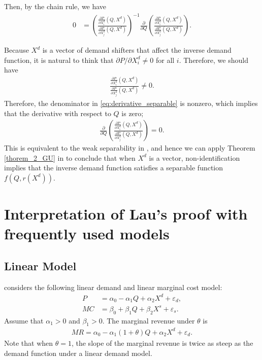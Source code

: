 \documentclass[11pt, a4paper]{article}
\theoremstyle{remark}
\begin{document}
Then, by the chain rule, we have
\begin{align}
    0 & = \left(\frac{\frac{\partial P}{\partial X^{d}_{i}}(Q, X^{d})}{\frac{\partial P}{\partial X^{d}_{j}}(Q, X^{d})}\right)^{-1} \frac{\partial}{\partial Q} \left(\frac{\frac{\partial P}{\partial X^{d}_{i}}(Q, X^{d})}{\frac{\partial P}{\partial X^{d}_{j}}(Q, X^{d})}\right).
    \label{eq:derivative_separable}
\end{align}

Because $X^{d}$ is a vector of demand shifters that affect the inverse demand function, it is natural to think that $\partial P/\partial X^{d}_{i} \ne 0$ for all $i$.
Therefore, we should have
\begin{align}
    \frac{\frac{\partial P}{\partial X^{d}_{i}}(Q, X^{d})}{\frac{\partial P}{\partial X^{d}_{j}}(Q, X^{d})} \ne 0.
\end{align}
Therefore, the denominator in \eqref{eq:derivative_separable} is nonzero, which implies that the derivative with respect to $Q$ is zero;
\begin{align}
    \frac{\partial}{\partial Q} \left(\frac{\frac{\partial P}{\partial X^{d}_{i}}(Q, X^{d})}{\frac{\partial P}{\partial X^{d}_{j}}(Q, X^{d})}\right) = 0.
\end{align}
This is equivalent to the weak separability in \citet{goldmanNote1964}, and hence we can apply Theorem \ref{thorem_2_GU} in \citet{goldmanNote1964} to conclude that when $X^{d}$ is a vector, non-identification implies that the inverse demand function satisfies a separable function $f(Q, r(X^{d}))$.



\section{Interpretation of Lau's proof with frequently used models}
\subsection{Linear Model}

\citet{bresnahan1982oligopoly} considers the following linear demand and linear marginal cost model:
\begin{align}
    P & = \alpha_0 - \alpha_1 Q + \alpha_2 X^d + \varepsilon_d,\label{eq:bresnahan_demand} \\
    MC & = \beta_0 + \beta_1 Q + \beta_2 X^s + \varepsilon_s. \label{eq:bresnahan_marginal_cost}
\end{align}
Assume that $\alpha_1>0$ and $\beta_1 >0$.
The marginal revenue under $\theta$ is
\begin{align}
    MR = \alpha_0 - \alpha_1(1 + \theta) Q + \alpha_2 X^d + \varepsilon_d. \label{eq:bresnahan_marginal_revenue}
\end{align}
Note that when $\theta = 1$, the slope of the marginal revenue is twice as steep as the demand function under a linear demand model.
\end{document}
